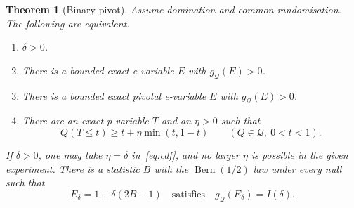 \documentclass[11pt,a4paper]{article}
\newtheorem{theorem}{Theorem}[section]
\theoremstyle{definition}
\theoremstyle{remark}
\newcommand{\QQ}{\mathcal Q}
\newcommand{\Bern}{\operatorname{Bern}}
\begin{document}
\begin{theorem}[Binary pivot]\label{thm:main}
Assume domination and common randomisation. The following are equivalent.
\begin{enumerate}[label=(\roman*)]
\item \(\delta>0\).
\item There is a bounded exact e-variable \(E\) with \(g_{\QQ}(E)>0\).
\item There is a bounded exact pivotal e-variable \(E\) with \(g_{\QQ}(E)>0\).
\item There are an exact p-variable \(T\) and an \(\eta>0\) such that
\begin{equation}\label{eq:cdf}
 Q(T\le t)\ge t+\eta\min(t,1-t)\qquad(Q\in\QQ,\ 0<t<1).
\end{equation}
\end{enumerate}
If \(\delta>0\), one may take \(\eta=\delta\) in~\eqref{eq:cdf}, and no larger \(\eta\) is possible in the given experiment. There is a statistic \(B\) with the \(\Bern(1/2)\) law under every null such that
\begin{equation}\label{eq:binary}
 E_\delta=1+\delta(2B-1)\quad\text{satisfies}\quad g_{\QQ}(E_\delta)=I(\delta).
\end{equation}
\end{theorem}
\end{document}
